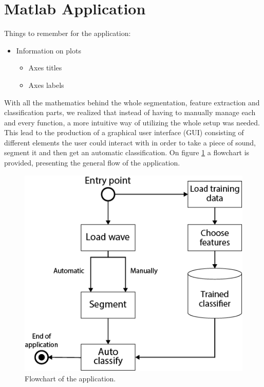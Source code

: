\section{Matlab Application}
Things to remember for the application:
\begin{itemize}
	\item Information on plots
	\begin{itemize}
		\item Axes titles
		\item Axes labels
	\end{itemize}
	
\end{itemize}

With all the mathematics behind the whole segmentation, feature extraction and classification parts, we realized that instead of having to manually manage each and every function, a more intuitive way of utilizing the whole setup was needed. This lead to the production of a graphical user interface (GUI) consisting of different elements the user could interact with in order to take a piece of sound, segment it and then get an automatic classification. On figure \ref{app-flowchart} a flowchart is provided, presenting the general flow of the application.

\begin{figure}
\begin{center}
\includegraphics[scale=0.6]{fig/Application_flowchart.png}
\caption{Flowchart of the application.}
\label{app-flowchart}
\end{center}
\end{figure}

